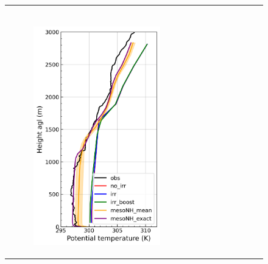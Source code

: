 \begin{figure}[hbtp]
{\begin{tabular}{@{}cccc@{}}
\begin{subfigure}[t]{0.283\textwidth}
        \end{subfigure} \\
        \begin{subfigure}[t]{0.382\textwidth}
            \caption{}
            \includegraphics[width=\textwidth]{images/chap5/profiles/profile_elsplans_theta_1507_.png}
        \end{subfigure} &
        \begin{subfigure}[t]{0.289\textwidth}
            \caption{}

\end{subfigure}
\end{tabular}}
\end{figure}
